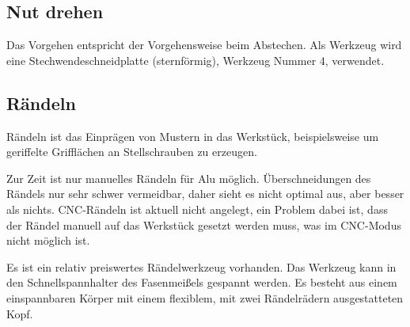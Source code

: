 \documentclass{\basedir/fablab-document}
\begin{document}
\subsection{Nut drehen}

Das Vorgehen entspricht der Vorgehensweise beim Abstechen.
Als Werkzeug wird eine Stechwendeschneidplatte (sternförmig), Werkzeug Nummer 4, verwendet.


\subsection{Rändeln}
\label{handdrehen:raendeln}

Rändeln ist das Einprägen von Mustern in das Werkstück, beispielsweise um geriffelte Grifflächen an Stellschrauben zu erzeugen.

Zur Zeit ist nur manuelles Rändeln für Alu möglich. Überschneidungen des Rändels nur sehr schwer vermeidbar, daher sieht es nicht optimal aus, aber besser als nichts. CNC-Rändeln ist aktuell nicht angelegt, ein Problem dabei ist, dass der Rändel manuell auf das Werkstück gesetzt werden muss, was im CNC-Modus nicht möglich ist.

Es ist ein relativ preiswertes Rändelwerkzeug vorhanden.
Das Werkzeug kann in den Schnellspannhalter des Fasenmeißels gespannt werden.
Es besteht aus einem einspannbaren Körper mit einem flexiblem, mit zwei Rändelrädern ausgestatteten Kopf.
\end{document}
